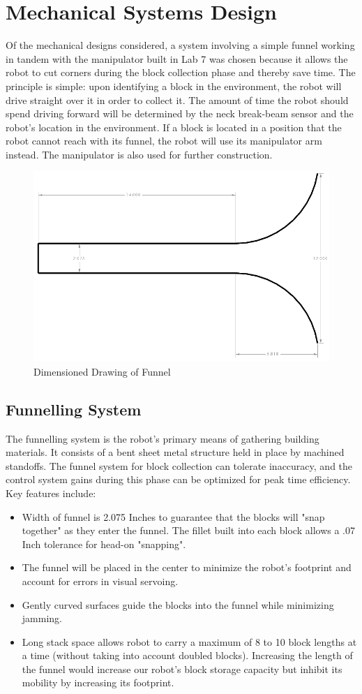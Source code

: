 \documentclass[letterpaper,11pt]{article}
\begin{document}
\section{Mechanical Systems Design}
Of the mechanical designs considered, a system involving a simple funnel working in tandem with the manipulator built in Lab 7 was chosen because it allows the robot to cut corners during the block collection phase and thereby save time. The principle is simple: upon identifying a block in the environment, the robot will drive straight over it in order to collect it. The amount of time the robot should spend driving forward will be determined by the neck break-beam sensor and the robot's location in the environment. If a block is located in a position that the robot cannot reach with its funnel, the robot will use its manipulator arm instead. The manipulator is also used for further construction.
\begin{figure}[h]
 \centering
  \includegraphics[width=4.5in]{images/Funnel}
\caption{Dimensioned Drawing of Funnel}
\label{fig:dimensioned}
\end{figure}
\subsection{Funnelling System}
The funnelling system is the robot's primary means of gathering building materials. It consists of a bent sheet metal structure held in place by machined standoffs. The funnel system for block collection can tolerate inaccuracy, and the control system gains during this phase can be optimized for peak time efficiency.
Key features include:
\begin{itemize}
\item Width of funnel is 2.075 Inches to guarantee that the blocks will "snap together" as they enter the funnel. The fillet built into each block allows a .07 Inch tolerance for head-on "snapping".
\item The funnel will be placed in the center to minimize the robot's footprint and account for errors in visual servoing. 
\item Gently curved surfaces guide the blocks into the funnel while minimizing jamming. 
\item Long stack space allows robot to carry a maximum of 8 to 10 block lengths at a time (without taking into account doubled blocks). Increasing the length of the funnel would increase our robot's block storage capacity but inhibit its mobility by increasing its footprint.
\end{itemize}
\end{document}
